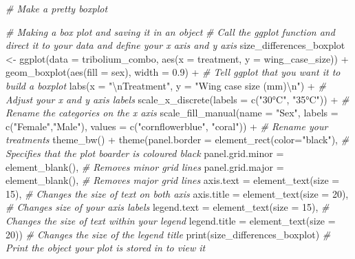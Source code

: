 \documentclass[
]{book}
\newenvironment{Shaded}{\begin{snugshade}}{\end{snugshade}}
\newcommand{\AttributeTok}[1]{\textcolor[rgb]{0.77,0.63,0.00}{#1}}
\newcommand{\CommentTok}[1]{\textcolor[rgb]{0.56,0.35,0.01}{\textit{#1}}}
\newcommand{\DecValTok}[1]{\textcolor[rgb]{0.00,0.00,0.81}{#1}}
\newcommand{\FloatTok}[1]{\textcolor[rgb]{0.00,0.00,0.81}{#1}}
\newcommand{\FunctionTok}[1]{\textcolor[rgb]{0.00,0.00,0.00}{#1}}
\newcommand{\NormalTok}[1]{#1}
\newcommand{\OtherTok}[1]{\textcolor[rgb]{0.56,0.35,0.01}{#1}}
\newcommand{\SpecialCharTok}[1]{\textcolor[rgb]{0.00,0.00,0.00}{#1}}
\newcommand{\StringTok}[1]{\textcolor[rgb]{0.31,0.60,0.02}{#1}}
\begin{document}
\begin{Shaded}
\begin{Highlighting}[]
\CommentTok{\# Make a pretty boxplot}

\CommentTok{\# Making a box plot and saving it in an object}
\CommentTok{\# Call the ggplot function and direct it to your data and define your x axis and y axis}
\NormalTok{size\_differences\_boxplot }\OtherTok{\textless{}{-}} \FunctionTok{ggplot}\NormalTok{(}\AttributeTok{data =}\NormalTok{ tribolium\_combo, }\FunctionTok{aes}\NormalTok{(}\AttributeTok{x =}\NormalTok{ treatment, }\AttributeTok{y =}\NormalTok{ wing\_case\_size)) }\SpecialCharTok{+} 
  \FunctionTok{geom\_boxplot}\NormalTok{(}\FunctionTok{aes}\NormalTok{(}\AttributeTok{fill =}\NormalTok{ sex), }\AttributeTok{width =} \FloatTok{0.9}\NormalTok{) }\SpecialCharTok{+} \CommentTok{\# Tell ggplot that you want it to build a boxplot}
  \FunctionTok{labs}\NormalTok{(}\AttributeTok{x =} \StringTok{"}\SpecialCharTok{\textbackslash{}n}\StringTok{Treatment"}\NormalTok{, }\AttributeTok{y =} \StringTok{"Wing case size (mm)}\SpecialCharTok{\textbackslash{}n}\StringTok{"}\NormalTok{) }\SpecialCharTok{+} \CommentTok{\# Adjust your x and y axis labels }
  \FunctionTok{scale\_x\_discrete}\NormalTok{(}\AttributeTok{labels =} \FunctionTok{c}\NormalTok{(}\StringTok{"30°C"}\NormalTok{, }\StringTok{"35°C"}\NormalTok{)) }\SpecialCharTok{+} \CommentTok{\# Rename the categories on the x axis }
  \FunctionTok{scale\_fill\_manual}\NormalTok{(}\AttributeTok{name =} \StringTok{"Sex"}\NormalTok{, }\AttributeTok{labels =} \FunctionTok{c}\NormalTok{(}\StringTok{"Female"}\NormalTok{,}\StringTok{"Male"}\NormalTok{), }\AttributeTok{values =} \FunctionTok{c}\NormalTok{(}\StringTok{"cornflowerblue"}\NormalTok{, }\StringTok{"coral"}\NormalTok{)) }\SpecialCharTok{+} \CommentTok{\# Rename your treatments}
  \FunctionTok{theme\_bw}\NormalTok{() }\SpecialCharTok{+}
  \FunctionTok{theme}\NormalTok{(}\AttributeTok{panel.border =} \FunctionTok{element\_rect}\NormalTok{(}\AttributeTok{color=}\StringTok{"black"}\NormalTok{), }\CommentTok{\# Specifies that the plot boarder is coloured black}
        \AttributeTok{panel.grid.minor =} \FunctionTok{element\_blank}\NormalTok{(), }\CommentTok{\# Removes minor grid lines }
        \AttributeTok{panel.grid.major =} \FunctionTok{element\_blank}\NormalTok{(), }\CommentTok{\# Removes major grid lines }
        \AttributeTok{axis.text =} \FunctionTok{element\_text}\NormalTok{(}\AttributeTok{size =} \DecValTok{15}\NormalTok{), }\CommentTok{\# Changes the size of text on both axis }
        \AttributeTok{axis.title =} \FunctionTok{element\_text}\NormalTok{(}\AttributeTok{size =} \DecValTok{20}\NormalTok{), }\CommentTok{\# Changes size of your axis labels }
        \AttributeTok{legend.text =} \FunctionTok{element\_text}\NormalTok{(}\AttributeTok{size =} \DecValTok{15}\NormalTok{), }\CommentTok{\# Changes the size of text within your legend}
        \AttributeTok{legend.title =} \FunctionTok{element\_text}\NormalTok{(}\AttributeTok{size =} \DecValTok{20}\NormalTok{)) }\CommentTok{\# Changes the size of the legend title  }
\FunctionTok{print}\NormalTok{(size\_differences\_boxplot) }\CommentTok{\# Print the object your plot is stored in to view it}


\end{Highlighting}
\end{Shaded}
\end{document}
